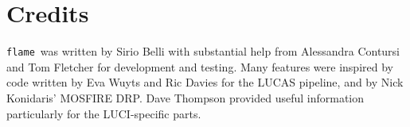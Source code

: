 \documentclass[a4paper, notitlepage]{article}
\newcommand{\flame}{\texttt{flame}}
\begin{document}


\vspace{10mm}

\section*{Credits}

\flame\ was written by Sirio Belli with substantial help from Alessandra Contursi and Tom Fletcher for development and testing. Many features were inspired by code written by Eva Wuyts and Ric Davies for the LUCAS pipeline, and by Nick Konidaris' MOSFIRE DRP. Dave Thompson provided useful information particularly for the LUCI-specific parts.
\end{document}
